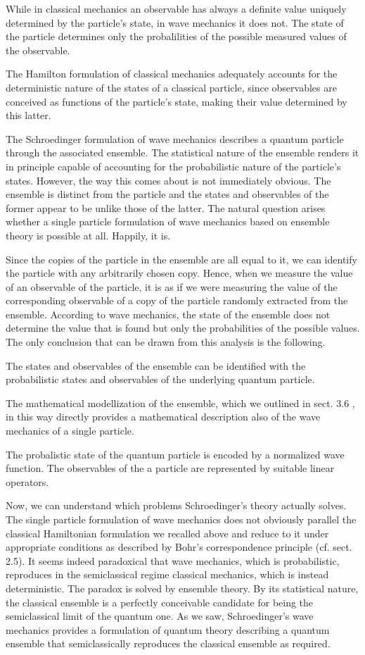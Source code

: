 \documentclass{article}
\begin{document}
While in classical mechanics an observable has always a definite value uniquely determined by the particle's state, in wave mechanics it does not. The state of the particle determines only the probalilities of the possible measured values of the observable.

The Hamilton formulation of classical mechanics adequately accounts for the deterministic nature of the states of a classical particle, since observables are conceived as functions of the particle's state, making their value determined by this latter.

The Schroedinger formulation of wave mechanics describes a quantum particle through the associated ensemble. The statistical nature of the ensemble renders it in principle capable of accounting for the probabilistic nature of the particle's states. However, the way this comes about is not immediately obvious. The ensemble is distinct from the particle and the states and observables of the former appear to be unlike those of the latter. The natural question arises whether a single particle formulation of wave mechanics based on ensemble theory is possible at all. Happily, it is.

Since the copies of the particle in the ensemble are all equal to it, we can identify the particle with any arbitrarily chosen copy. Hence, when we measure the value of an observable of the particle, it is as if we were measuring the value of the corresponding observable of a copy of the particle randomly extracted from the ensemble. According to wave mechanics, the state of the ensemble does not determine the value that is found but only the probabilities of the possible values. The only conclusion that can be drawn from this analysis is the following.

The states and observables of the ensemble can be identified with the probabilistic states and observables of the underlying quantum particle.

The mathematical modellization of the ensemble, which we outlined in sect. 3.6 , in this way directly provides a mathematical description also of the wave mechanics of a single particle.

The probalistic state of the quantum particle is encoded by a normalized wave function. The observables of the a particle are represented by suitable linear operators.

Now, we can understand which problems Schroedinger's theory actually solves. The single particle formulation of wave mechanics does not obviously parallel the classical Hamiltonian formulation we recalled above and reduce to it under appropriate conditions as described by Bohr's correspondence principle (cf. sect. 2.5). It seems indeed paradoxical that wave mechanics, which is probabilistic, reproduces in the semiclassical regime classical mechanics, which is instead deterministic. The paradox is solved by ensemble theory. By its statistical nature, the classical ensemble is a perfectly conceivable candidate for being the semiclassical limit of the quantum one. As we saw, Schroedinger's wave mechanics provides a formulation of quantum theory describing a quantum ensemble that semiclassically reproduces the classical ensemble as required.
\end{document}
